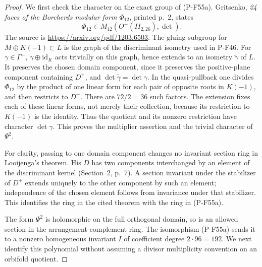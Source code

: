 \begin{proof}
We first check the character on the exact group of (P-F55a).
Gritsenko, \emph{24 faces of the Borcherds modular form
$\Phi_{12}$}, printed p.~2, states
\[
             \Phi_{12}\in M_{12}(O^+(II_{2,26}),\det).
\]
The source is \url{https://arxiv.org/pdf/1203.6503}.
The gluing subgroup for
$M\oplus K(-1)\subset L$ is the graph of the discriminant
isometry used in P-F46. For $\gamma\in\Gamma^+$,
$\gamma\oplus\mathrm{id}_K$ acts trivially on this graph, hence
extends to an isometry $\widetilde\gamma$ of $L$.
It preserves the chosen domain component, since it preserves
the positive-plane component containing $D^+$, and
$\det\widetilde\gamma=\det\gamma$.
In the quasi-pullback one divides $\Phi_{12}$ by the product
of one linear form for each pair of opposite roots in $K(-1)$,
and then restricts to $D^+$. There are $72/2=36$ such factors.
The extension fixes each of these linear forms, not merely
their collection, because its restriction to $K(-1)$ is the
identity. Thus the quotient and its nonzero restriction have
character $\det\gamma$. This proves the multiplier assertion
and the trivial character of $\Psi^2$.

For clarity, passing to one domain component changes no invariant
section ring in Looijenga's theorem. His $D$ has two components
interchanged by an element of the discriminant kernel
(Section~2, p.~7). A section invariant under the stabilizer
of $D^+$ extends uniquely to the other component by such an
element; independence of the chosen element follows from
invariance under that stabilizer. This identifies the ring in
the cited theorem with the ring in (P-F55a).

The form $\Psi^2$ is holomorphic on the full orthogonal domain,
so is an allowed section in the arrangement-complement ring.
The isomorphism (P-F55a) sends it to a nonzero homogeneous
invariant $I$ of coefficient degree $2\cdot96=192$.
We next identify this polynomial without assuming a divisor
multiplicity convention on an orbifold quotient.


\end{proof}
